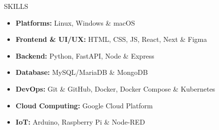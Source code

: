\documentclass{resume}
\begin{document}
\vspace{0.8em}

\begin{rSection}{SKILLS}
\begin{itemize}
    \item \textbf{Platforms:} Linux, Windows \& macOS
    \item \textbf{Frontend \& UI/UX: } HTML, CSS, JS, React, Next \& Figma
    \item \textbf{Backend: } Python, FastAPI, Node \& Express
    \item \textbf{Database: } MySQL/MariaDB \& MongoDB
    \item \textbf{DevOps:} Git \& GitHub, Docker, Docker Compose \& Kubernetes
    \item \textbf{Cloud Computing:} Google Cloud Platform
    \item \textbf{IoT:} Arduino, Raspberry Pi \& Node-RED
\end{itemize}
\end{rSection}
\vspace{0.8em}
\end{document}
